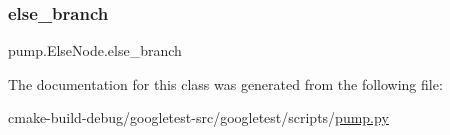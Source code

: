 \subsubsection{\texorpdfstring{else\_branch}{else\_branch}}
{\footnotesize\ttfamily pump.\+Else\+Node.\+else\+\_\+branch}



The documentation for this class was generated from the following file\+:\begin{DoxyCompactItemize}
\item 
cmake-\/build-\/debug/googletest-\/src/googletest/scripts/\mbox{\hyperlink{pump_8py}{pump.\+py}}\end{DoxyCompactItemize}
